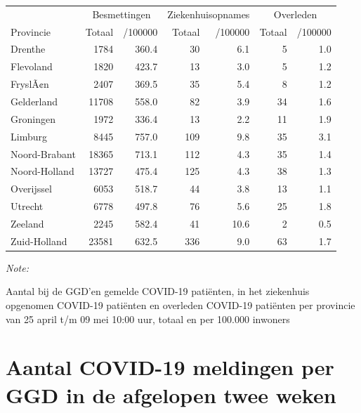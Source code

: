 \documentclass[
  english,
  man,floatsintext]{apa6}
\begin{document}
\begin{table}
\centering
\begin{threeparttable}
\begin{tabular}{lrrrrrr}
\toprule
\multicolumn{1}{c}{ } & \multicolumn{2}{c}{Besmettingen} & \multicolumn{2}{c}{Ziekenhuisopnames} & \multicolumn{2}{c}{Overleden} \\
\cmidrule(l{3pt}r{3pt}){2-3} \cmidrule(l{3pt}r{3pt}){4-5} \cmidrule(l{3pt}r{3pt}){6-7}
Provincie & Totaal & /100000 & Totaal & /100000 & Totaal & /100000\\
\midrule
Drenthe & 1784 & 360.4 & 30 & 6.1 & 5 & 1.0\\
Flevoland & 1820 & 423.7 & 13 & 3.0 & 5 & 1.2\\
FryslÃ¢n & 2407 & 369.5 & 35 & 5.4 & 8 & 1.2\\
Gelderland & 11708 & 558.0 & 82 & 3.9 & 34 & 1.6\\
Groningen & 1972 & 336.4 & 13 & 2.2 & 11 & 1.9\\
Limburg & 8445 & 757.0 & 109 & 9.8 & 35 & 3.1\\
Noord-Brabant & 18365 & 713.1 & 112 & 4.3 & 35 & 1.4\\
Noord-Holland & 13727 & 475.4 & 125 & 4.3 & 38 & 1.3\\
Overijssel & 6053 & 518.7 & 44 & 3.8 & 13 & 1.1\\
Utrecht & 6778 & 497.8 & 76 & 5.6 & 25 & 1.8\\
Zeeland & 2245 & 582.4 & 41 & 10.6 & 2 & 0.5\\
Zuid-Holland & 23581 & 632.5 & 336 & 9.0 & 63 & 1.7\\
\bottomrule
\end{tabular}
\begin{tablenotes}
\item \textit{Note: } 
\item Aantal bij de GGD’en gemelde COVID-19 patiënten, in het ziekenhuis opgenomen COVID-19 patiënten en overleden COVID-19 patiënten per provincie van 25 april t/m 09 mei 10:00 uur, totaal en per 100.000 inwoners
\end{tablenotes}
\end{threeparttable}
\end{table}

\newpage

\hypertarget{aantal-covid-19-meldingen-per-ggd-in-de-afgelopen-twee-weken}{%
\section{Aantal COVID-19 meldingen per GGD in de afgelopen twee weken}\label{aantal-covid-19-meldingen-per-ggd-in-de-afgelopen-twee-weken}}
\end{document}
